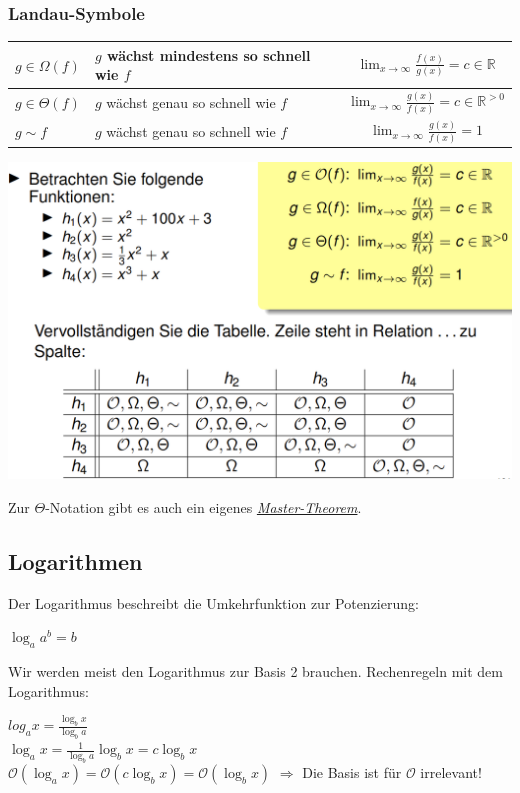 \documentclass[12pt,a4paper]{article}
\begin{document}
\subsubsection{Landau-Symbole}
\begin{tabularx}{\textwidth}{|l|X|c|}
	\hline
	$g  \in  \Omega (f)$ & $g$ wächst mindestens so schnell wie $f$ & $\lim_{x \to \infty} \frac{f(x)}{g(x)} = c \in \mathbb{R}$ \\
	\hline
	$g  \in  \Theta (f)$ & $g$ wächst genau so schnell wie $f$ & $\lim_{x \to \infty} \frac{g(x)}{f(x)} = c \in \mathbb{R}^{>0}$ \\
	\hline
	$g \sim f$ & $g$ wächst genau so schnell wie $f$ & $\lim_{x \to \infty} \frac{g(x)}{f(x)} = 1$ \\
	\hline
\end{tabularx}
\begin{center}
	\includegraphics[scale=0.6]{Bilder/landau.PNG}
\end{center}
Zur $\Theta $-Notation gibt es auch ein eigenes \textit{\hyperref[sec:MasterLandau]{Master-Theorem}}.

\subsection{Logarithmen}
Der Logarithmus beschreibt die Umkehrfunktion zur Potenzierung:
\begin{center}
	$\log_a a^b = b$
\end{center}
Wir werden meist den Logarithmus zur Basis 2 brauchen.\newline
Rechenregeln mit dem Logarithmus:
\begin{center}
	$log_ax = \frac{\log_bx}{\log_ba}$\\
	\vspace*{.6cm}
	$\log_ax = \frac{1}{\log_ba}\log_bx = c\log_bx$\\
	\vspace*{.6cm}
	$\mathcal{O}(\log_ax) = \mathcal{O}(c\log_bx) = \mathcal{O}(\log_bx)$ $\Rightarrow $ Die Basis ist für $\mathcal{O}$ irrelevant!
\end{center}
\end{document}
